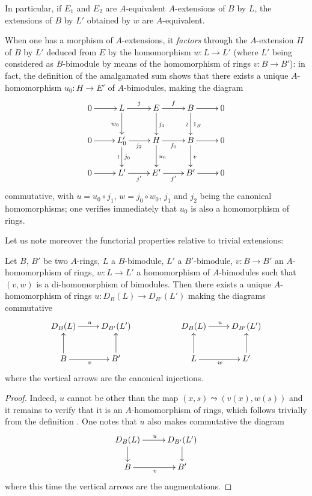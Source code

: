 \begin{env}[18.2.8]
In particular, if $E_1$ and $E_2$ are $A$-equivalent $A$-extensions of $B$ by $L$, the extensions of $B$ by $L'$ obtained by $w$ are $A$-equivalent.

When one has a morphism  of $A$-extensions, it \emph{factors} through the $A$-extension $H$ of $B$ by $L'$ deduced from $E$ by the homomorphism $w:L\to L'$ (where $L'$ being considered as $B$-bimodule by means of the homomorphism of rings $v:B\to B'$):
in fact, the definition of the amalgamated sum shows that there exists a unique $A$-homomorphism $u_0:H\to E'$ of $A$-bimodules, making the diagram
\[
  \xymatrix{
    0\ar[r] & L\ar[r]^j\ar[d]_{w_0} & E\ar[r]^f\ar[d]^{j_1} & B\ar[r]\ar[d]^{1_B}_{\wr} & 0\\
    0\ar[r] & L'_0\ar[r]_{j_2}\ar[d]^{j_0}_{\wr} & H\ar[r]_{f_0}\ar[d]^{u_0} & B\ar[r]\ar[d]^v & 0\\
    0\ar[r] & L'\ar[r]_{j'} & E'\ar[r]_{f'} & B'\ar[r] & 0
  }
\]
commutative, with $u=u_0\circ j_1$, $w=j_0\circ w_0$, $j_1$ and $j_2$ being the canonical homomorphisms; one verifies immediately that $u_0$ is also a homomorphism of rings.

Let us note moreover the functorial properties relative to trivial extensions:
\end{env}

\begin{proposition}[18.2.9]
\label{0.18.2.9}
Let $B$, $B'$ be two $A$-rings, $L$ a $B$-bimodule, $L'$ a $B'$-bimodule, $v:B\to B'$ an $A$-homomorphism of rings, $w:L\to L'$ a homomorphism of $A$-bimodules such that $(v,w)$ is a di-homomorphism of bimodules.
Then there exists a unique $A$-homomorphism of rings $u:D_B(L)\to D_{B'}(L')$ making the diagrams commutative
\[
  \xymatrix{
    D_B(L)\ar[r]^u & D_{B'}(L') & & D_B(L)\ar[r]^u & D_{B'}(L')\\
    B\ar[u]\ar[r]_v & B'\ar[u] & & L\ar[u]\ar[r]_w & L'\ar[u]
  }
\]
where the vertical arrows are the canonical injections.
\end{proposition}


\begin{proof}
Indeed, $u$ cannot be other than the map $(x,s)\leadsto(v(x),w(s))$ and it remains to verify that it is an $A$-homomorphism of rings, which follows trivially from the definition .
One notes that $u$ also makes commutative the diagram
\[
  \xymatrix@C=2.2pc@R=1.5pc{
    D_B(L)\ar[r]^u\ar[d] & D_{B'}(L')\ar[d]\\
    B\ar[r]_v & B'
  }
\]
where this time the vertical arrows are the augmentations.
\end{proof}

